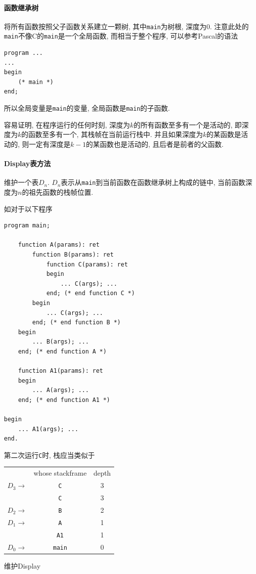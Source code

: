 \documentclass{ctexart}
\begin{document}
\paragraph{函数继承树}
    将所有函数按照父子函数关系建立一颗树,
    其中\verb/main/为树根, 深度为$0$.
    注意此处的\verb/main/不像C的\verb/main/是一个全局函数,
    而相当于整个程序, 可以参考Pascal的语法\begin{verbatim}program ...
... 
begin 
    (* main *) 
end;\end{verbatim} 所以全局变量是\verb/main/的变量, 全局函数是\verb/main/的子函数.\par
    容易证明, 在程序运行的任何时刻, 深度为$k$的所有函数至多有一个是活动的,
    即深度为$k$的函数至多有一个, 其栈帧在当前运行栈中.
    并且如果深度为$k$的某函数是活动的, 则一定有深度是$k-1$的某函数也是活动的, 且后者是前者的父函数.
\paragraph{Display表方法}
    维护一个表$D_n$.
    $D_n$表示从\verb/main/到当前函数在函数继承树上构成的链中,
    当前函数深度为$n$的祖先函数的栈帧位置.\par
    如对于以下程序\pagebreak
\begin{Verbatim}[samepage=true]
program main;

    function A(params): ret
        function B(params): ret
            function C(params): ret
            begin
                ... C(args); ...
            end; (* end function C *)
        begin
            ... C(args); ...
        end; (* end function B *)
    begin
        ... B(args); ...
    end; (* end function A *)

    function A1(params): ret
    begin
        ... A(args); ...
    end; (* end function A1 *)

begin
    ... A1(args); ...
end.
\end{Verbatim}
第二次运行\verb/C/时, 栈应当类似于\\
    \begin{center}\begin{tabularx}{0.6\textwidth}{r|C|c|}
        & whose stackframe & depth\\
        $D_3 \to$ & \verb/C/ & 3
        \\
        & \verb/C/ & 3
        \\
        $D_2 \to$ & \verb/B/ & 2
        \\
        $D_1 \to$ & \verb/A/ & 1
        \\
        & \verb/A1/ & 1
        \\
        $D_0 \to$ & \verb/main/ & 0
        \\
    \end{tabularx}
    \end{center}
维护Display
\end{document}
